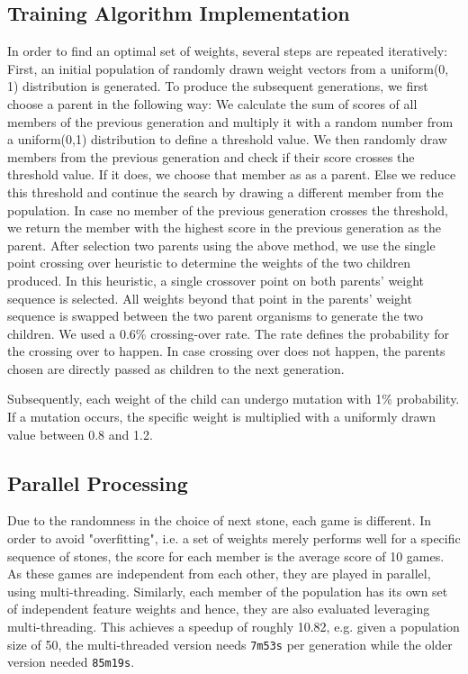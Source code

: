 \subsection{Training Algorithm Implementation}
In order to find an optimal set of weights, several steps are repeated iteratively: First, an initial population of randomly drawn weight vectors from a uniform(0, 1) distribution is generated. 
\newline
To produce the subsequent generations, we first choose a parent in the following way: We calculate the sum of scores of all members of the previous generation and multiply it with a random number from a uniform(0,1) distribution to define a threshold value. We then randomly draw members from the previous generation and check if their score crosses the threshold value. If it does, we choose that member as as a parent. Else we reduce this threshold and continue the search by drawing a different member from the population. In case no member of the previous generation crosses the threshold, we return the member with the highest score in the previous generation as the parent.
\newline
After selection two parents using the above method, we use the single point crossing over heuristic to determine the weights of the two children produced. In this heuristic, a single crossover point on both parents' weight sequence is selected. All weights beyond that point in the parents' weight sequence is swapped between the two parent organisms to generate the two children. We used a 0.6\% crossing-over rate. The rate defines the probability for the crossing over to happen. In case crossing over does not happen, the parents chosen are directly passed as children to the next generation.

Subsequently, each weight of the child can undergo mutation with 1\% probability. If a mutation occurs, the specific weight is multiplied with a uniformly drawn value between 0.8 and 1.2.

\subsection{Parallel Processing}
Due to the randomness in the choice of next stone, each game is different. In order to avoid "overfitting", i.e. a set of weights merely performs well for a specific sequence of stones, the score for each member is the average score of 10 games. As these games are independent from each other, they are played in parallel, using multi-threading. Similarly, each member of the population has its own set of independent feature weights and hence, they are also evaluated leveraging multi-threading.
This achieves a speedup of roughly 10.82, e.g. given a population size of 50, the multi-threaded version needs \texttt{7m53s} per generation while the older version needed \texttt{85m19s}.

